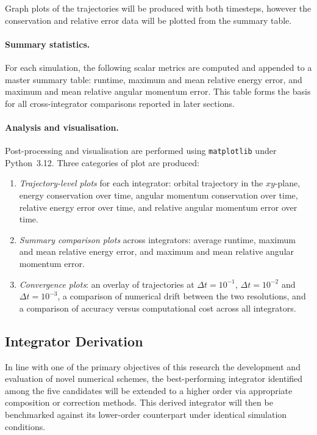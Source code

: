Graph plots of the trajectories will be produced with both timesteps, however the conservation and relative error data
will be plotted from the summary table.

\paragraph{Summary statistics.}
For each simulation, the following scalar metrics are computed and appended to a master summary table: runtime,
maximum and mean relative energy error, and maximum and mean relative angular momentum error. This table forms
the basis for all cross-integrator comparisons reported in later sections.

\paragraph{Analysis and visualisation.}
Post-processing and visualisation are performed using \texttt{matplotlib} under Python~3.12. Three categories of
plot are produced:
\begin{enumerate}
    \item \textit{Trajectory-level plots} for each integrator: orbital trajectory in the $xy$-plane, energy
    conservation over time, angular momentum conservation over time, relative energy error over time, and relative
    angular momentum error over time.
    \item \textit{Summary comparison plots} across integrators: average runtime, maximum and mean relative energy
    error, and maximum and mean relative angular momentum error.
    \item \textit{Convergence plots}: an overlay of trajectories at $\Delta t = 10^{-1}$, $\Delta t = 10^{-2}$ and
    $\Delta t = 10^{-3}$,
    a comparison of numerical drift between the two resolutions, and a comparison of accuracy versus computational
    cost across all integrators.
\end{enumerate}

\subsection{Integrator Derivation}

In line with one of the primary objectives of this research the development and evaluation of novel numerical schemes,
the best-performing integrator identified among the five candidates will be extended to a higher order via appropriate
composition or correction methods.
This derived integrator will then be benchmarked against its lower-order counterpart under identical simulation conditions.

